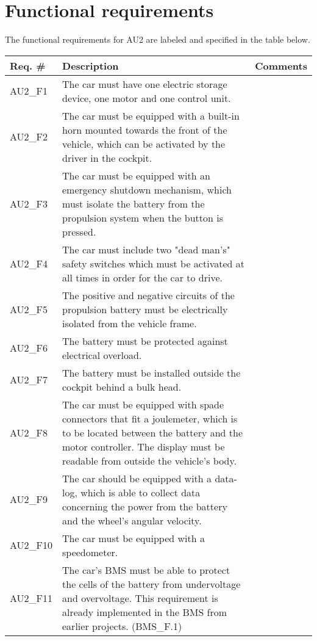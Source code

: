 \section{Functional requirements}
The functional requirements for AU2 are labeled and specified in the table below.

\begin{longtable}{|p{2 cm}|p{7 cm}|p{4 cm}|}
		\hline
		\textbf{Req. \#} & \textbf{Description} & \textbf{Comments} \\\hline
		AU2\_F1		& The car must have one electric storage device, one motor and one control unit. &   \\\hline
		AU2\_F2		& The car must be equipped with a built-in horn mounted towards the front of the vehicle, which can be activated by the driver in the cockpit. &   \\\hline
		AU2\_F3		& The car must be equipped with an emergency shutdown mechanism, which must isolate the battery from the propulsion system when the button is pressed. &   \\\hline
		AU2\_F4		& The car must include two "dead man's" safety switches which must be activated at all times in order for the car to drive. &   \\\hline
		AU2\_F5	& The positive and negative circuits of the propulsion battery  must be electrically isolated from the vehicle frame. &   \\\hline
		AU2\_F6	& 
		The battery must be protected against electrical overload. &   \\\hline
		AU2\_F7		& The battery must be installed outside the cockpit behind a bulk head. &   \\\hline
		AU2\_F8	& The car must be equipped with spade connectors that fit a joulemeter, which is to be located between the battery and the motor controller. The display must be readable from outside the vehicle's body. &   \\\hline
		AU2\_F9	& The car should be equipped with a data-log, which is able to collect data concerning the power from the battery and the wheel's angular velocity. &   \\\hline
		AU2\_F10	& The car must be equipped with a speedometer. &   \\\hline
		AU2\_F11	& The car's BMS must be able to protect the cells of the battery from undervoltage and overvoltage. This requirement is already implemented in the BMS from earlier projects. (BMS\_F.1) \fxnote{reference to 2013BMS Documentation} &   \\\hline

\end{longtable}
